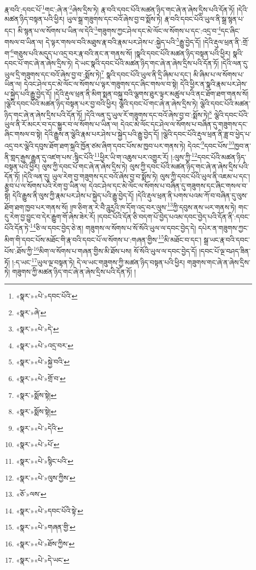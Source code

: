 རྣ་བའི་:དབང་པོ་\footnote{«སྣར་»«པེ་»དབང་པོའི་}གང་:ཞེ་ན་\footnote{«སྣར་»ཞེ་}ཞེས་དྲིས་ཏེ། རྣ་བའི་དབང་པོའི་མཚན་ཉིད་གང་ཞེ་ན་ཞེས་དྲིས་པའི་དོན་ཏོ། །དེའི་མཚན་ཉིད་བསྟན་པའི་ཕྱིར། ཡུལ་སྒྲ་གཟུགས་དང་བའོ་ཞེས་བྱ་བ་སྨོས་ཏེ། རྣ་བའི་དབང་པོའི་ཡུལ་ནི་སྒྲ་སྙན་པ་དང་། མི་སྙན་པ་ལ་སོགས་པ་ཡིན་ལ་དེའི་\footnote{«སྣར་»«པེ་»དེ་}གཟུགས་ཀྱང་ཤེལ་དང་མེ་ལོང་ལ་སོགས་པ་དང་:འདྲ་བ་\footnote{«སྣར་»«པེ་»འདྲ་བར་}དང་ཞིང་གསལ་བ་ཡིན་ལ། དེ་ལྟར་གསལ་བའི་མཐུས་རྣ་བའི་རྣམ་པར་ཤེས་པ་:སྐྱེད་པའི་\footnote{«སྣར་»«པེ་»སྐྱེ་བའི་}རྒྱུ་བྱེད་དོ། །དེའི་རྡུལ་ཕྲན་ནི་:གྲོ་ག་\footnote{«སྣར་»«པེ་»གྲོ་བ་}གཅུས་པའི་མདུད་པ་འདྲ་བར་རྣ་བའི་ནང་ན་གནས་སོ། །སྣའི་དབང་པོའི་མཚན་ཉིད་བསྟན་པའི་ཕྱིར། སྣའི་དབང་པོ་གང་ཞེ་ན་ཞེས་དྲིས་ཏེ། དེ་ཡང་སྣའི་དབང་པོའི་མཚན་ཉིད་གང་ཞེ་ན་ཞེས་དྲིས་པའི་དོན་ཏོ། །དེའི་ལན་དུ་ཡུལ་དྲི་གཟུགས་དང་བའོ་ཞེས་བྱ་བ་:སྨོས་ཏེ།\footnote{«སྣར་»སྨོས་སྟེ།} སྣའི་དབང་པོའི་ཡུལ་ནི་དྲི་ཞིམ་པ་དང་། མི་ཞིམ་པ་ལ་སོགས་པ་ཡིན་ལ། དེའང་ཤེལ་དང་མེ་ལོང་ལ་སོགས་པ་ལྟར་གཟུགས་དང་ཞིང་གསལ་བ་སྟེ། དེའི་ཕྱིར་ན་སྣའི་རྣམ་པར་ཤེས་པ་སྐྱེད་པའི་རྒྱུ་བྱེད་དོ། །དེའི་རྡུལ་ཕྲན་ནི་མིག་སྨན་བསྐུ་བའི་ལྕགས་ཐུར་ལྟར་མཚུལ་པའི་ནང་ཐོག་ཐག་གནས་སོ། །ལྕེའི་དབང་པོའི་མཚན་ཉིད་བསྟན་པར་བྱ་བའི་ཕྱིར། ལྕེའི་དབང་པོ་གང་ཞེ་ན་ཞེས་དྲིས་ཏེ། ལྕེའི་དབང་པོའི་མཚན་ཉིད་གང་ཞེ་ན་ཞེས་དྲིས་པའི་དོན་ཏོ། །དེའི་ལན་དུ་ཡུལ་རོ་གཟུགས་དང་བའོ་ཞེས་བྱ་བ་:སྨོས་ཏེ།\footnote{«སྣར་»སྨོས་སྟེ།} ལྕེའི་དབང་པོའི་ཡུལ་ནི་རོ་མངར་བ་དང་སྐྱུར་བ་ལ་སོགས་པ་ཡིན་ལ། དེའང་མེ་ལོང་དང་ཤེལ་ལ་སོགས་པ་བཞིན་དུ་གཟུགས་དང་ཞིང་གསལ་བ་སྟེ། དེའི་རྒྱུས་ན་ལྕེའི་རྣམ་པར་ཤེས་པ་སྐྱེད་པའི་རྒྱུ་བྱེད་དོ། །ལྕེའི་དབང་པོའི་རྡུལ་ཕྲན་ནི་ཟླ་བ་ཕྱེད་པ་འདྲ་བར་ལྕེའི་དབུས་ཐོག་ཐག་སྐྲའི་ཁྱོན་ཙམ་ཞིག་དབང་པོས་མ་ཁྱབ་པར་གནས་ཏེ། དེའང་\footnote{«སྣར་»«པེ་»དེའི་}དབང་པོས་\footnote{«སྣར་»«པེ་»པོ་}ཁྱབ་ན་ནི་གླད་རྒྱས་རྒྱུན་དུ་འཛག་པས་:སྙིང་པོའི་\footnote{«སྣར་»«པེ་»སྙིང་པའི་}ཕྱིར་ཡི་ག་འཆུས་པར་འགྱུར་རོ། །:ལུས་ཀྱི་\footnote{«སྣར་»«པེ་»ལུས་ཀྱིས་}དབང་པོའི་མཚན་ཉིད་བསྟན་པའི་ཕྱིར། ལུས་ཀྱི་དབང་པོ་གང་ཞེ་ན་ཞེས་དྲིས་ཏེ། ལུས་ཀྱི་དབང་པོའི་མཚན་ཉིད་གང་ཞེ་ན་ཞེས་དྲིས་པའི་དོན་ཏོ། །དེའི་ལན་དུ། ཡུལ་རེག་བྱ་གཟུགས་དང་བའོ་ཞེས་བྱ་བ་སྨོས་ཏེ། ལུས་ཀྱི་དབང་པོའི་ཡུལ་ནི་འཇམ་པ་དང་། རྩུབ་པ་ལ་སོགས་པའི་རེག་བྱ་ཡིན་ལ། དེའང་ཤེལ་དང་མེ་ལོང་ལ་སོགས་པ་བཞིན་དུ་གཟུགས་དང་ཞིང་གསལ་བ་སྟེ། དེའི་རྒྱུས་ནི་ལུས་ཀྱི་རྣམ་པར་ཤེས་པ་སྐྱེད་པའི་རྒྱུ་བྱེད་དོ། །དེའི་རྡུལ་ཕྲན་ནི་པགས་པའམ་ཀོ་བ་བཞིན་དུ་ལུས་ཐོག་ཐག་ཁྱབ་པར་གནས་སོ། །ཁ་ཅིག་ན་རེ་བཻ་ཌཱུརྱའི་ཁ་དོག་འདྲ་བར་ལུས་\footnote{«ཅོ་»ལས་}ཀྱི་དབུས་ནས་ཡར་གནས་ཏེ། གང་དུ་རེག་བྱ་བྱུང་བ་དེར་རྒྱུག་གོ་ཞེས་ཟེར་རོ། །དབང་པོའི་དོན་ཅི་བདག་པོ་བྱེད་པའམ་དབང་བྱེད་པའི་དོན་ནི་:དབང་པོའི་དོན་ཏེ་\footnote{«སྣར་»«པེ་»དབང་པོའི་སྟེ་}ཅི་ལ་དབང་བྱེད་ཅེ་ན། གཟུགས་ལ་སོགས་པ་སོ་སོའི་ཡུལ་ལ་དབང་བྱེད་དེ། དཔེར་ན་གཟུགས་ཀྱང་མིག་གི་དབང་པོས་མཐོང་གི་རྣ་བའི་དབང་པོ་ལ་སོགས་པ་:གཞན་གྱིས་\footnote{«སྣར་»«པེ་»གཞན་གྱི་}མི་མཐོང་བ་དང་། སྒྲ་ཡང་རྣ་བའི་དབང་པོས་:ཐོས་ཀྱི་\footnote{«སྣར་»«པེ་»ཐོས་ཀྱིས་}མིག་ལ་སོགས་པ་གཞན་གྱིས་མི་ཐོས་པས། སོ་སོའི་ཡུལ་ལ་དབང་བྱེད་དོ། །དབང་པོ་ལྔ་བཤད་ཟིན་ཏོ། །:ད་ཡང་\footnote{«སྣར་»«པེ་»དེ་ཡང་}ཡུལ་ལྔ་བསྟན་ཏེ། དེ་ལ་ཡང་གཟུགས་ཀྱི་མཚན་ཉིད་བསྟན་པའི་ཕྱིར། གཟུགས་གང་ཞེ་ན་ཞེས་དྲིས་ཏེ། གཟུགས་ཀྱི་མཚན་ཉིད་གང་ཞེ་ན་ཞེས་དྲིས་པའི་དོན་ཏོ། །

